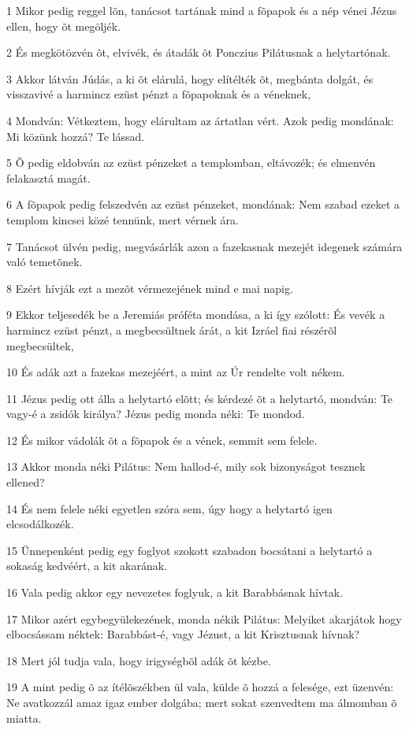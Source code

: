 \par 1 Mikor pedig reggel lõn, tanácsot tartának mind a fõpapok és a nép vénei Jézus ellen, hogy õt megöljék.
\par 2 És megkötözvén õt, elvivék, és átadák õt Ponczius Pilátusnak a helytartónak.
\par 3 Akkor látván Júdás, a ki õt elárulá, hogy elítélték õt, megbánta dolgát, és visszavivé a harmincz ezüst pénzt a fõpapoknak és a véneknek,
\par 4 Mondván: Vétkeztem, hogy elárultam az ártatlan vért. Azok pedig mondának: Mi közünk hozzá? Te lássad.
\par 5 Õ pedig eldobván az ezüst pénzeket a templomban, eltávozék; és elmenvén felakasztá magát.
\par 6 A fõpapok pedig felszedvén az ezüst pénzeket, mondának: Nem szabad ezeket a templom kincsei közé tennünk, mert vérnek ára.
\par 7 Tanácsot ülvén pedig, megvásárlák azon a fazekasnak mezejét idegenek számára való temetõnek.
\par 8 Ezért hívják ezt a mezõt vérmezejének mind e mai napig.
\par 9 Ekkor teljesedék be a Jeremiás próféta mondása, a ki így szólott: És vevék a harmincz ezüst pénzt, a megbecsültnek árát, a kit Izráel fiai részérõl megbecsültek,
\par 10 És adák azt a fazekas mezejéért, a mint az Úr rendelte volt nékem.
\par 11 Jézus pedig ott álla a helytartó elõtt; és kérdezé õt a helytartó, mondván: Te vagy-é a zsidók királya? Jézus pedig monda néki: Te mondod.
\par 12 És mikor vádolák õt a fõpapok és a vének, semmit sem felele.
\par 13 Akkor monda néki Pilátus: Nem hallod-é, mily sok bizonyságot tesznek ellened?
\par 14 És nem felele néki egyetlen szóra sem, úgy hogy a helytartó igen elcsodálkozék.
\par 15 Ünnepenként pedig egy foglyot szokott szabadon bocsátani a helytartó a sokaság kedvéért, a kit akarának.
\par 16 Vala pedig akkor egy nevezetes foglyuk, a kit Barabbásnak hívtak.
\par 17 Mikor azért egybegyülekezének, monda nékik Pilátus: Melyiket akarjátok hogy elbocsássam néktek: Barabbást-é, vagy Jézust, a kit Krisztusnak hívnak?
\par 18 Mert jól tudja vala, hogy irigységbõl adák õt kézbe.
\par 19 A mint pedig õ az ítélõszékben ül vala, külde õ hozzá a felesége, ezt üzenvén: Ne avatkozzál amaz igaz ember dolgába; mert sokat szenvedtem ma álmomban õ miatta.
